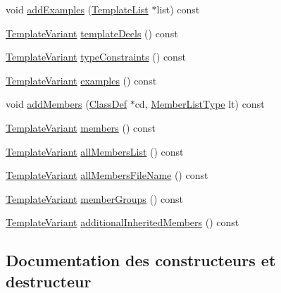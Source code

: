 \begin{DoxyCompactItemize}
\item 
void \hyperlink{class_class_context_1_1_private_aa4e40dc67852f74d37aeebc315a82e0f}{add\+Examples} (\hyperlink{class_template_list}{Template\+List} $\ast$list) const 
\item 
\hyperlink{class_template_variant}{Template\+Variant} \hyperlink{class_class_context_1_1_private_a6dcee6f70267a8d29fa87c6f6369e5d1}{template\+Decls} () const 
\item 
\hyperlink{class_template_variant}{Template\+Variant} \hyperlink{class_class_context_1_1_private_a6859c87bacf2ba2cc6c155aad674698f}{type\+Constraints} () const 
\item 
\hyperlink{class_template_variant}{Template\+Variant} \hyperlink{class_class_context_1_1_private_a9db82e66caaab60eabf46973b15f43c0}{examples} () const 
\item 
void \hyperlink{class_class_context_1_1_private_a23a6512e33c6fb7b59686100448c2ac7}{add\+Members} (\hyperlink{class_class_def}{Class\+Def} $\ast$cd, \hyperlink{types_8h_abe8ad5992f8938a28f918f51b199aa19}{Member\+List\+Type} lt) const 
\item 
\hyperlink{class_template_variant}{Template\+Variant} \hyperlink{class_class_context_1_1_private_a5c62512746b1ed2752e4bd80bab6e1f8}{members} () const 
\item 
\hyperlink{class_template_variant}{Template\+Variant} \hyperlink{class_class_context_1_1_private_a80ebe06da04a2e2ac76c0c1b9b5b37f7}{all\+Members\+List} () const 
\item 
\hyperlink{class_template_variant}{Template\+Variant} \hyperlink{class_class_context_1_1_private_a36b4a4127c8985ba84d9c2752bc9cac5}{all\+Members\+File\+Name} () const 
\item 
\hyperlink{class_template_variant}{Template\+Variant} \hyperlink{class_class_context_1_1_private_abe0544911280ab85917f12cee4f1f96d}{member\+Groups} () const 
\item 
\hyperlink{class_template_variant}{Template\+Variant} \hyperlink{class_class_context_1_1_private_a5e3d2569d02e1634fc1836ed99235aa0}{additional\+Inherited\+Members} () const 
\end{DoxyCompactItemize}


\subsection{Documentation des constructeurs et destructeur}
\hypertarget{class_class_context_1_1_private_aa4af906e43ecb186baea35ce137f5e57}{}
